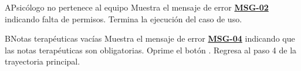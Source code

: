 \begin{UCtrayectoriaA}{A}{Psicólogo no pertenece al equipo}
	\UCpaso Muestra el mensaje de error \hyperlink{mMSG02}{\bf MSG-02} indicando falta de permisos.
	\UCpaso Termina la ejecución del caso de uso.
\end{UCtrayectoriaA}

\begin{UCtrayectoriaA}{B}{Notas terapéuticas vacías}
	\UCpaso Muestra el mensaje de error \hyperlink{mMSG04}{\bf MSG-04} indicando que las notas terapéuticas son obligatorias.
	\UCpaso[\UCactor] Oprime el botón .
	\UCpaso Regresa al paso 4 de la trayectoria principal.
\end{UCtrayectoriaA}

